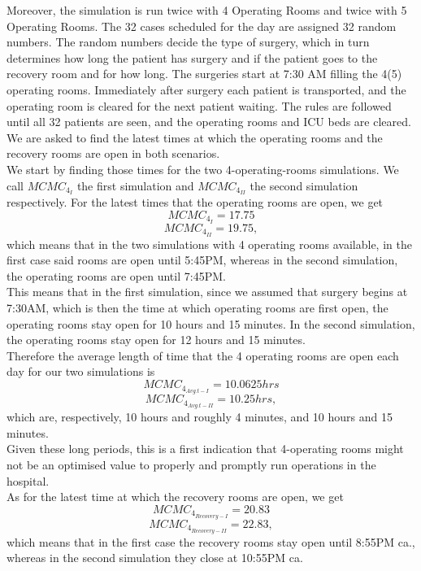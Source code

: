 Moreover, the simulation is run twice with 4 Operating Rooms and twice with 5 Operating Rooms.
The 32 cases scheduled for the day are assigned 32 random numbers.
The random numbers decide the type of surgery, which in turn determines how long the patient has surgery and if the patient goes to the recovery room and for how long.
The surgeries start at 7:30 AM filling the 4(5) operating rooms. Immediately after surgery each patient is transported, and the operating room is cleared for the next patient waiting.
The rules are followed until all 32 patients are seen, and the operating rooms and ICU beds are cleared.\\
We are asked to find the latest times at which the operating rooms and the recovery rooms are open in both scenarios.\\
We start by finding those times for the two 4-operating-rooms simulations. We call $MCMC_{4_{I}}$ the first simulation and $MCMC_{4_{II}}$ the second simulation respectively. For the latest times that the operating rooms are open, we get
$$
MCMC_{4_{I}} = 17.75
$$
$$
MCMC_{4_{II}} = 19.75,
$$
which means that in the two simulations with 4 operating rooms available, in the first case said rooms are open until 5:45PM, whereas in the second simulation, the operating rooms are open until 7:45PM.\\
This means that in the first simulation, since we assumed that surgery begins at 7:30AM, which is then the time at which operating rooms are first open, the operating rooms stay open for 10 hours and 15 minutes. In the second simulation, the operating rooms stay open for 12 hours and 15 minutes.\\
Therefore the average length of time that the 4 operating rooms are open each day for our two simulations is
$$
MCMC_{4_{Avg.t - I}} = 10.0625hrs
$$
$$
MCMC_{4_{Avg.t - II}} = 10.25hrs,
$$
which are, respectively, 10 hours and roughly 4 minutes, and 10 hours and 15 minutes.\\ 
Given these long periods, this is a first indication that 4-operating rooms might not be an optimised value to properly and promptly run operations in the hospital.\\
As for the latest time at which the recovery rooms are open, we get
$$
MCMC_{4_{Recovery-I}} = 20.83
$$
$$
MCMC_{4_{Recovery-II}} = 22.83,
$$
which means that in the first case the recovery rooms stay open until 8:55PM ca., whereas in the second simulation they close at 10:55PM ca.\\

